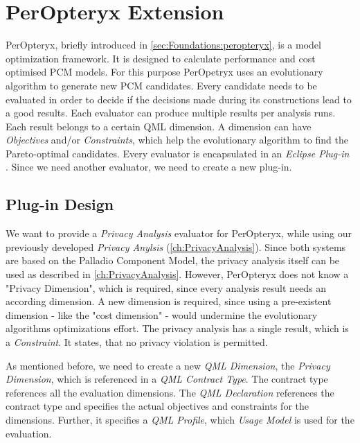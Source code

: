 \chapter{PerOpteryx Extension}
\label{ch:PerOpt}

PerOpteryx, briefly introduced in \autoref{sec:Foundations:peropteryx}, is a model optimization framework. It is designed to calculate performance and cost optimised PCM models. For this purpose PerOpetryx uses an evolutionary algorithm to generate new PCM candidates. Every candidate needs to be evaluated in order to decide if the decisions made during its constructions lead to a good results. Each evaluator can produce multiple results per analysis runs. Each result belongs to a certain QML dimension. A dimension can have \textit{Objectives} and/or \textit{Constraints}, which help the evolutionary algorithm to find the Pareto-optimal candidates. Every evaluator is encapsulated in an \textit{Eclipse Plug-in} \cite{PerOpteryx.b}. Since we need another evaluator, we need to create a new plug-in.

\section{Plug-in Design}
\label{sec:PerOpt:design}

We want to provide a \textit{Privacy Analysis} evaluator for PerOpteryx, while using our previously developed \textit{Privacy Anylsis} (\autoref{ch:PrivacyAnalysis}). Since both systems are based on the Palladio Component Model, the privacy analysis itself can be used as described in \autoref{ch:PrivacyAnalysis}. However, PerOpteryx does not know a "Privacy Dimension", which is required, since every analysis result needs an according dimension. A new dimension is required, since using a pre-existent dimension - like the "cost dimension" - would undermine the evolutionary algorithms optimizations effort. The privacy analysis has a single result, which is a \textit{Constraint}. It states, that no privacy violation is permitted.

As mentioned before, we need to create a new \textit{QML Dimension}, the \textit{Privacy Dimension}, which is referenced in a \textit{QML Contract Type}. The contract type references all the evaluation dimensions. The \textit{QML Declaration} references the contract type and specifies the actual objectives and constraints for the dimensions. Further, it specifies a \textit{QML Profile}, which \textit{Usage Model} is used for the evaluation.


